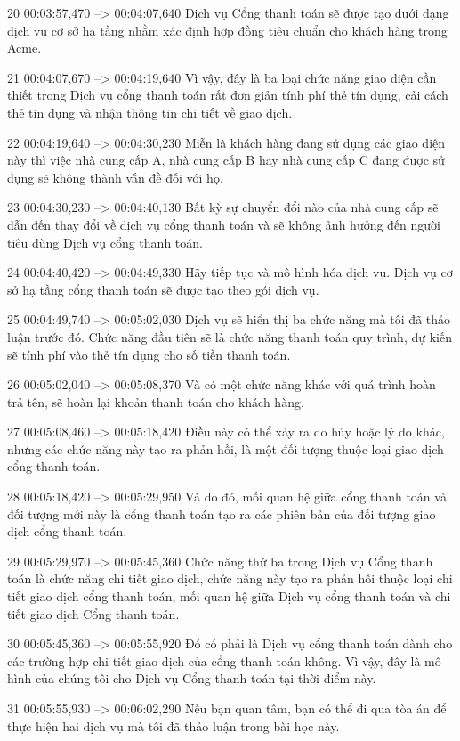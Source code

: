 20
00:03:57,470 --> 00:04:07,640
Dịch vụ Cổng thanh toán sẽ được tạo dưới dạng dịch vụ cơ sở hạ tầng nhằm xác định hợp đồng tiêu chuẩn cho khách hàng trong Acme.

21
00:04:07,670 --> 00:04:19,640
Vì vậy, đây là ba loại chức năng giao diện cần thiết trong Dịch vụ cổng thanh toán rất đơn giản tính phí thẻ tín dụng, cải cách thẻ tín dụng và nhận thông tin chi tiết về giao dịch.

22
00:04:19,640 --> 00:04:30,230
Miễn là khách hàng đang sử dụng các giao diện này thì việc nhà cung cấp A, nhà cung cấp B hay nhà cung cấp C đang được sử dụng sẽ không thành vấn đề đối với họ.

23
00:04:30,230 --> 00:04:40,130
Bất kỳ sự chuyển đổi nào của nhà cung cấp sẽ dẫn đến thay đổi về dịch vụ cổng thanh toán và sẽ không ảnh hưởng đến người tiêu dùng Dịch vụ cổng thanh toán.

24
00:04:40,420 --> 00:04:49,330
Hãy tiếp tục và mô hình hóa dịch vụ.  Dịch vụ cơ sở hạ tầng cổng thanh toán sẽ được tạo theo gói dịch vụ.

25
00:04:49,740 --> 00:05:02,030
Dịch vụ sẽ hiển thị ba chức năng mà tôi đã thảo luận trước đó.  Chức năng đầu tiên sẽ là chức năng thanh toán quy trình, dự kiến ​​​​sẽ tính phí vào thẻ tín dụng cho số tiền thanh toán.

26
00:05:02,040 --> 00:05:08,370
Và có một chức năng khác với quá trình hoàn trả tên, sẽ hoàn lại khoản thanh toán cho khách hàng.

27
00:05:08,460 --> 00:05:18,420
Điều này có thể xảy ra do hủy hoặc lý do khác, nhưng các chức năng này tạo ra phản hồi, là một đối tượng thuộc loại giao dịch cổng thanh toán.

28
00:05:18,420 --> 00:05:29,950
Và do đó, mối quan hệ giữa cổng thanh toán và đối tượng mới này là cổng thanh toán tạo ra các phiên bản của đối tượng giao dịch cổng thanh toán.

29
00:05:29,970 --> 00:05:45,360
Chức năng thứ ba trong Dịch vụ Cổng thanh toán là chức năng chi tiết giao dịch, chức năng này tạo ra phản hồi thuộc loại chi tiết giao dịch cổng thanh toán, mối quan hệ giữa Dịch vụ cổng thanh toán và chi tiết giao dịch Cổng thanh toán.

30
00:05:45,360 --> 00:05:55,920
Đó có phải là Dịch vụ cổng thanh toán dành cho các trường hợp chi tiết giao dịch của cổng thanh toán không.  Vì vậy, đây là mô hình của chúng tôi cho Dịch vụ Cổng thanh toán tại thời điểm này.

31
00:05:55,930 --> 00:06:02,290
Nếu bạn quan tâm, bạn có thể đi qua tòa án để thực hiện hai dịch vụ mà tôi đã thảo luận trong bài học này.

